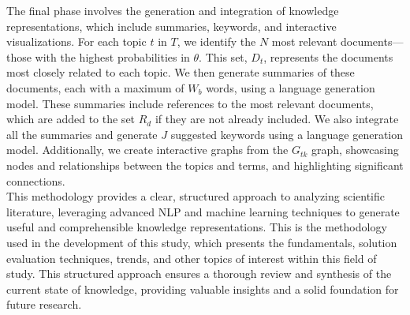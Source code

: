 \documentclass[runningheads]{llncs}
\begin{document}
The final phase involves the generation and integration of knowledge representations, which include summaries, keywords, and interactive visualizations. For each topic $t$ in $T$, we identify the $N$ most relevant documents—those with the highest probabilities in $\theta$. This set, $D_t$, represents the documents most closely related to each topic. We then generate summaries of these documents, each with a maximum of $W_b$ words, using a language generation model. These summaries include references to the most relevant documents, which are added to the set $R_d$ if they are not already included. We also integrate all the summaries and generate $J$ suggested keywords using a language generation model. Additionally, we create interactive graphs from the $G_{tk}$ graph, showcasing nodes and relationships between the topics and terms, and highlighting significant connections.\\

This methodology provides a clear, structured approach to analyzing scientific literature, leveraging advanced NLP and machine learning techniques to generate useful and comprehensible knowledge representations. This is the methodology used in the development of this study, which presents the fundamentals, solution evaluation techniques, trends, and other topics of interest within this field of study. This structured approach ensures a thorough review and synthesis of the current state of knowledge, providing valuable insights and a solid foundation for future research.
\end{document}
